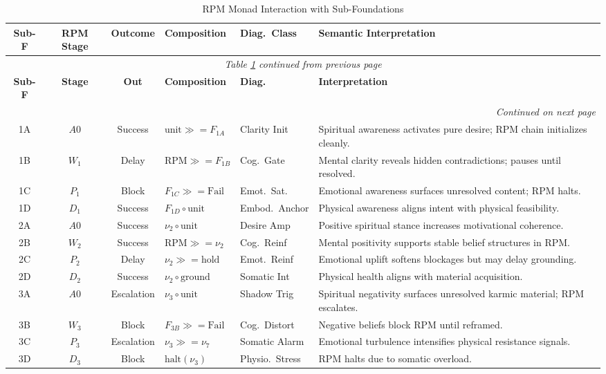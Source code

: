 \renewcommand{\arraystretch}{1.28}
\small
\begin{longtable}{c|c|c|p{2cm}|p{1.5cm}|p{4.5cm}}
\caption{RPM Monad Interaction with Sub-Foundations}
\label{tab:rpm-subfoundation} \\
\toprule
\textbf{Sub-F}
& \textbf{RPM Stage}
& \textbf{Outcome}
& \textbf{Composition}
& \textbf{Diag.\ Class}
& \textbf{Semantic Interpretation}
\\
\midrule
\endfirsthead
\multicolumn{6}{c}{\textit{Table \ref{tab:rpm-subfoundation} continued from previous page}} \\
\toprule
\textbf{Sub-F}
& \textbf{Stage}
& \textbf{Out}
& \textbf{Composition}
& \textbf{Diag.}
& \textbf{Interpretation}
\\
\midrule
\endhead
\midrule
\multicolumn{6}{r}{\textit{Continued on next page}} \\
\endfoot
\bottomrule
\endlastfoot

1A & $A0$ & Success &
$\text{unit} \gg= F_{1A}$ &
Clarity Init &
Spiritual awareness activates pure desire; RPM chain initializes cleanly.
\\
1B & $W_1$ & Delay &
$\text{RPM} \gg= F_{1B}$ &
Cog.\ Gate &
Mental clarity reveals hidden contradictions; pauses until resolved.
\\
1C & $P_1$ & Block &
$F_{1C} \gg= \text{Fail}$ &
Emot.\ Sat. &
Emotional awareness surfaces unresolved content; RPM halts.
\\
1D & $D_1$ & Success &
$F_{1D} \circ \text{unit}$ &
Embod.\ Anchor &
Physical awareness aligns intent with physical feasibility.
\\
\midrule

2A & $A0$ & Success &
$\nu_2 \circ \text{unit}$ &
Desire Amp &
Positive spiritual stance increases motivational coherence.
\\
2B & $W_2$ & Success &
$\text{RPM} \gg= \nu_2$ &
Cog.\ Reinf &
Mental positivity supports stable belief structures in RPM.
\\
2C & $P_2$ & Delay &
$\nu_2 \gg= \text{hold}$ &
Emot.\ Reinf &
Emotional uplift softens blockages but may delay grounding.
\\
2D & $D_2$ & Success &
$\nu_2 \circ \text{ground}$ &
Somatic Int &
Physical health aligns with material acquisition.
\\
\midrule

3A & $A0$ & Escalation &
$\nu_3 \circ \text{unit}$ &
Shadow Trig &
Spiritual negativity surfaces unresolved karmic material; RPM escalates.
\\
3B & $W_3$ & Block &
$F_{3B} \gg= \text{Fail}$ &
Cog.\ Distort &
Negative beliefs block RPM until reframed.
\\
3C & $P_3$ & Escalation &
$\nu_3 \gg= \nu_7$ &
Somatic Alarm &
Emotional turbulence intensifies physical resistance signals.
\\
3D & $D_3$ & Block &
$\text{halt}(\nu_3)$ &
Physio.\ Stress &
RPM halts due to somatic overload.
\\
\midrule


\end{longtable}
